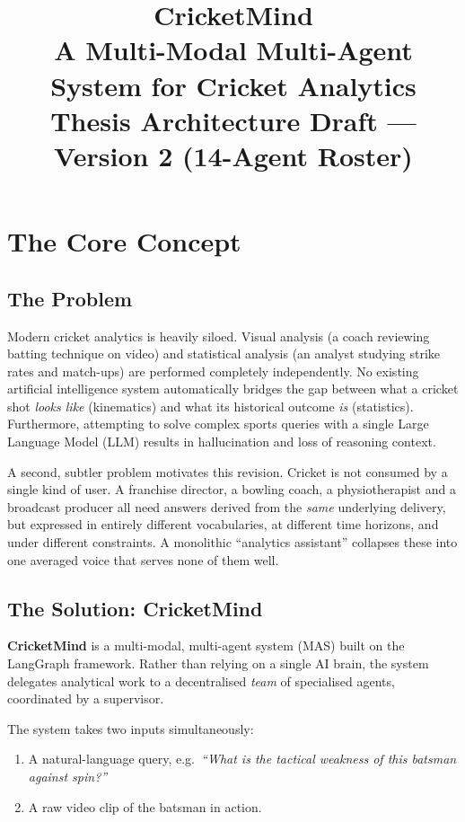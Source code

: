 \documentclass[11pt,a4paper]{article}
\title{\textbf{CricketMind}\\[0.3em]
       \large A Multi-Modal Multi-Agent System for Cricket Analytics\\[0.2em]
       \normalsize Thesis Architecture Draft --- Version 2 (14-Agent Roster)}
\author{}
\date{}
\begin{document}
\maketitle
\thispagestyle{empty}

\section{The Core Concept}

\subsection*{The Problem}
Modern cricket analytics is heavily siloed. Visual analysis (a coach reviewing
batting technique on video) and statistical analysis (an analyst studying strike
rates and match-ups) are performed completely independently. No existing
artificial intelligence system automatically bridges the gap between what a
cricket shot \emph{looks like} (kinematics) and what its historical outcome
\emph{is} (statistics). Furthermore, attempting to solve complex sports queries
with a single Large Language Model (LLM) results in hallucination and loss of
reasoning context.

A second, subtler problem motivates this revision. Cricket is not consumed by a
single kind of user. A franchise director, a bowling coach, a physiotherapist and
a broadcast producer all need answers derived from the \emph{same} underlying
delivery, but expressed in entirely different vocabularies, at different time
horizons, and under different constraints. A monolithic ``analytics assistant''
collapses these into one averaged voice that serves none of them well.

\subsection*{The Solution: CricketMind}
\textbf{CricketMind} is a multi-modal, multi-agent system (MAS) built on the
LangGraph framework. Rather than relying on a single AI brain, the system
delegates analytical work to a decentralised \emph{team} of specialised agents,
coordinated by a supervisor.

The system takes two inputs simultaneously:
\begin{enumerate}[nosep,leftmargin=1.6em]
  \item A natural-language query, e.g.\ \emph{``What is the tactical weakness of
        this batsman against spin?''}
  \item A raw video clip of the batsman in action.
\end{enumerate}
\end{document}
